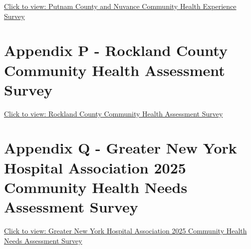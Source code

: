 \documentclass[
  english,
  letterpaper,
]{report}
\begin{document}
\href{../media/appendix-docs/O\%20-\%20Putnam\%20Community\%20Health\%20Experience\%20Survey_English.pdf}{Click
to view: Putnam County and Nuvance Community Health Experience Survey}

\section{Appendix P - Rockland County Community Health Assessment
Survey}\label{sec-appendix-p-rockland-county-community-health-assessment-survey}

\href{../media/appendix-docs/P\%20-\%20Rockland\%20Community\%20Health\%20Assessment\%20Survey_English\%20Paper\%20Version.pdf}{Click
to view: Rockland County Community Health Assessment Survey}

\section{Appendix Q - Greater New York Hospital Association 2025
Community Health Needs Assessment
Survey}\label{sec-appendix-q-gnyha-2025-community-health-needs-assessment-survey}

\href{../media/appendix-docs/Q\%20-\%202025\%20CHNA\%20Collab\%20Survey_English.pdf}{Click
to view: Greater New York Hospital Association 2025 Community Health
Needs Assessment Survey}
\end{document}
